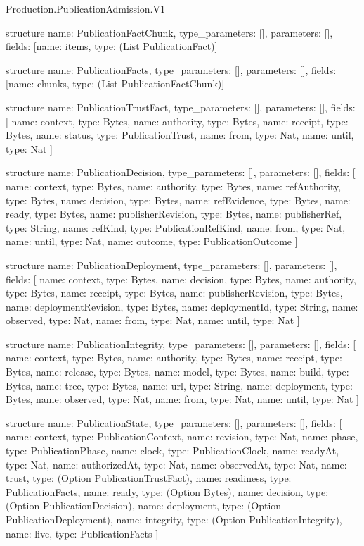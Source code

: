\begin{lexlean}{Production.PublicationAdmission.V1}
\begin{semanticmodule}
structure{
  name: PublicationFactChunk,
  type_parameters: [],
  parameters: [],
  fields: [{name: items, type: (List PublicationFact)}]
}

structure{
  name: PublicationFacts,
  type_parameters: [],
  parameters: [],
  fields: [{name: chunks, type: (List PublicationFactChunk)}]
}

structure{
  name: PublicationTrustFact,
  type_parameters: [],
  parameters: [],
  fields: [
    {name: context, type: Bytes},
    {name: authority, type: Bytes},
    {name: receipt, type: Bytes},
    {name: status, type: PublicationTrust},
    {name: from, type: Nat},
    {name: until, type: Nat}
  ]
}

structure{
  name: PublicationDecision,
  type_parameters: [],
  parameters: [],
  fields: [
    {name: context, type: Bytes},
    {name: authority, type: Bytes},
    {name: refAuthority, type: Bytes},
    {name: decision, type: Bytes},
    {name: refEvidence, type: Bytes},
    {name: ready, type: Bytes},
    {name: publisherRevision, type: Bytes},
    {name: publisherRef, type: String},
    {name: refKind, type: PublicationRefKind},
    {name: from, type: Nat},
    {name: until, type: Nat},
    {name: outcome, type: PublicationOutcome}
  ]
}

structure{
  name: PublicationDeployment,
  type_parameters: [],
  parameters: [],
  fields: [
    {name: context, type: Bytes},
    {name: decision, type: Bytes},
    {name: authority, type: Bytes},
    {name: receipt, type: Bytes},
    {name: publisherRevision, type: Bytes},
    {name: deploymentRevision, type: Bytes},
    {name: deploymentId, type: String},
    {name: observed, type: Nat},
    {name: from, type: Nat},
    {name: until, type: Nat}
  ]
}

structure{
  name: PublicationIntegrity,
  type_parameters: [],
  parameters: [],
  fields: [
    {name: context, type: Bytes},
    {name: authority, type: Bytes},
    {name: receipt, type: Bytes},
    {name: release, type: Bytes},
    {name: model, type: Bytes},
    {name: build, type: Bytes},
    {name: tree, type: Bytes},
    {name: url, type: String},
    {name: deployment, type: Bytes},
    {name: observed, type: Nat},
    {name: from, type: Nat},
    {name: until, type: Nat}
  ]
}

structure{
  name: PublicationState,
  type_parameters: [],
  parameters: [],
  fields: [
    {name: context, type: PublicationContext},
    {name: revision, type: Nat},
    {name: phase, type: PublicationPhase},
    {name: clock, type: PublicationClock},
    {name: readyAt, type: Nat},
    {name: authorizedAt, type: Nat},
    {name: observedAt, type: Nat},
    {name: trust, type: (Option PublicationTrustFact)},
    {name: readiness, type: PublicationFacts},
    {name: ready, type: (Option Bytes)},
    {name: decision, type: (Option PublicationDecision)},
    {name: deployment, type: (Option PublicationDeployment)},
    {name: integrity, type: (Option PublicationIntegrity)},
    {name: live, type: PublicationFacts}
  ]
}


\end{semanticmodule}
\end{lexlean}
